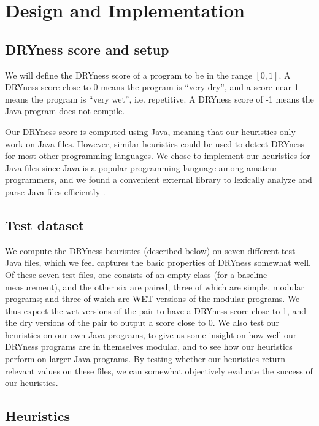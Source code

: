 \documentclass{article}
\begin{document}
\section{Design and Implementation}

\subsection{DRYness score and setup}

We will define the DRYness score of a program to be in the range $[0,1]$. A DRYness score close to 0 means the program is ``very dry'',
and a score near 1 means the program is ``very wet'', i.e. repetitive. A DRYness score of -1 means the Java program does not compile.

Our DRYness score is computed using Java, meaning that our heuristics only work on Java files. However, similar heuristics could 
be used to detect DRYness for most other programming languages. We chose to implement our heuristics for Java files since Java 
is a popular programming language among amateur programmers, and we found a convenient external library to lexically analyze and parse
Java files efficiently \cite{Javaparser}.

\subsection{Test dataset}

We compute the DRYness heuristics (described below) on seven different test Java files, which we feel captures the basic properties
of DRYness somewhat well. Of these seven test files, one consists of an empty class (for a baseline measurement), and the other six are paired,
three of which are simple, modular programs; and three of which are WET versions of the modular programs. We thus expect the wet versions of the pair to have a DRYness score close to 1, and the dry versions of the pair
to output a score close to 0. We also test our heuristics on our own Java programs, to give us some insight on how well our DRYness
programs are in themselves modular, and to see how our heuristics perform on larger Java programs. By testing whether our heuristics return relevant values on these files, we can somewhat objectively evaluate the success of our heuristics.

\subsection{Heuristics}
\end{document}
